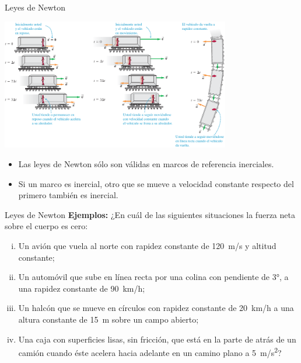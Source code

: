 \documentclass[9pt, aspectratio=169]{beamer}
\begin{document}
\begin{frame}{Leyes de Newton}
\begin{center} 
    \includegraphics[width=0.75\textwidth]{figs/fig-05.png}
\end{center}
\begin{itemize}
    \item Las leyes de Newton sólo son válidas en marcos de referencia inerciales.
    \item Si un marco es inercial, otro que se mueve a velocidad constante respecto del primero también es inercial.
\end{itemize}
\end{frame}

\begin{frame}{Leyes de Newton}
    \textbf{Ejemplos:} ¿En cuál de las siguientes situaciones la fuerza neta sobre el cuerpo es cero:
    \begin{enumerate}[i)]
        \item Un avión que vuela al norte con rapidez constante de \qty{120}{m/s} y altitud constante;
        \item Un automóvil que sube en línea recta por una colina con pendiente de \ang{3}, a una rapidez constante de \qty{90}{km/h};
        \item Un halcón que se mueve en círculos con rapidez constante de \qty{20}{km/h} a una altura constante de \qty{15}{m} sobre un campo abierto;
        \item Una caja con superficies lisas, sin fricción, que está en la parte de atrás de un camión cuando éste acelera hacia adelante en un camino plano a \qty{5}{m/s^2}?
    \end{enumerate}
\end{frame}
\end{document}
